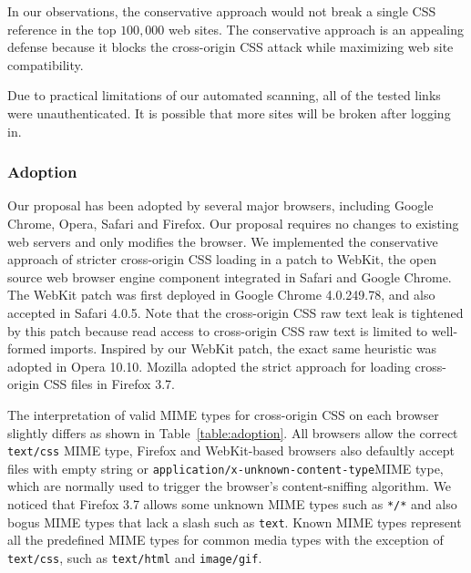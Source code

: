\documentclass{acm_proc_article-sp}
\begin{document}
In our observations, the conservative approach would not break a single CSS reference in the top $100,000$ web sites. The conservative approach is an appealing defense because it blocks the cross-origin CSS attack while maximizing web site compatibility.

Due to practical limitations of our automated scanning, all of the tested links were unauthenticated. It is possible that more sites will be broken after logging in.

\subsubsection{Adoption}
Our proposal has been adopted by several major browsers, including Google Chrome, Opera, Safari and Firefox. Our proposal requires no changes to existing web servers and only modifies the browser. We implemented the conservative approach of stricter cross-origin CSS loading in a patch to WebKit, the open source web browser engine component integrated in Safari and Google Chrome. The WebKit patch was first deployed in Google Chrome 4.0.249.78, and also accepted in Safari 4.0.5. Note that the cross-origin CSS raw text leak is tightened by this patch because read access to cross-origin CSS raw text is limited to well-formed imports. Inspired by our WebKit patch, the exact same heuristic was adopted in Opera 10.10. Mozilla adopted the strict approach for loading cross-origin CSS files in Firefox 3.7.

The interpretation of valid MIME types for cross-origin CSS on each browser slightly differs as shown in Table~\ref{table:adoption}. All browsers allow the correct \texttt{text/css} MIME type, Firefox and WebKit-based browsers also defaultly accept files with empty string or \texttt{application/x-unknown-content-type}\linebreak MIME type, which are normally used to trigger the browser's content-sniffing algorithm. We noticed that Firefox 3.7 allows some unknown MIME types such as \texttt{*/*} and also bogus MIME types that lack a slash such as \texttt{text}. Known MIME types represent all the predefined MIME types for common media types with the exception of \texttt{text/css}, such as \texttt{text/html} and \texttt{image/gif}.
\end{document}
